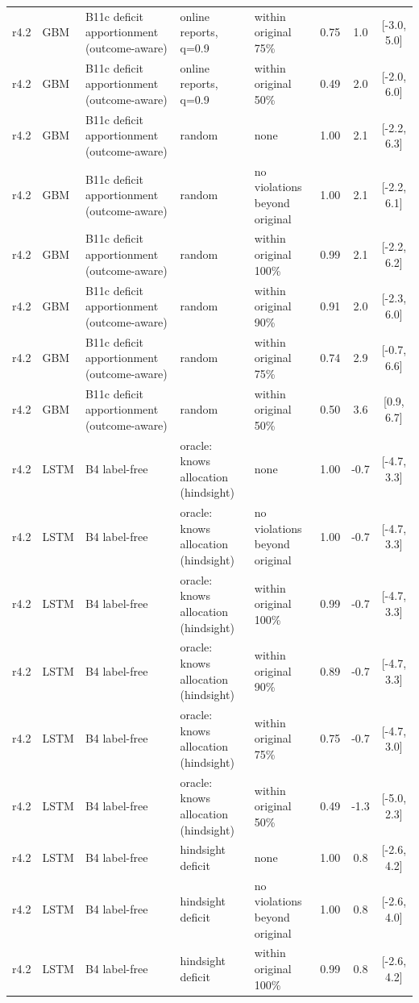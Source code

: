 \documentclass[10pt,onecolumn,letterpaper]{article}
\begin{document}
\begin{longtable}{lllp{4.2cm}p{3.4cm}ccc}
r4.2 & GBM & B11c deficit apportionment (outcome-aware) & online reports, q=0.9 & within original 75\% & 0.75 & 1.0 & [-3.0, 5.0] \\
r4.2 & GBM & B11c deficit apportionment (outcome-aware) & online reports, q=0.9 & within original 50\% & 0.49 & 2.0 & [-2.0, 6.0] \\
r4.2 & GBM & B11c deficit apportionment (outcome-aware) & random & none & 1.00 & 2.1 & [-2.2, 6.3] \\
r4.2 & GBM & B11c deficit apportionment (outcome-aware) & random & no violations beyond original & 1.00 & 2.1 & [-2.2, 6.1] \\
r4.2 & GBM & B11c deficit apportionment (outcome-aware) & random & within original 100\% & 0.99 & 2.1 & [-2.2, 6.2] \\
r4.2 & GBM & B11c deficit apportionment (outcome-aware) & random & within original 90\% & 0.91 & 2.0 & [-2.3, 6.0] \\
r4.2 & GBM & B11c deficit apportionment (outcome-aware) & random & within original 75\% & 0.74 & 2.9 & [-0.7, 6.6] \\
r4.2 & GBM & B11c deficit apportionment (outcome-aware) & random & within original 50\% & 0.50 & 3.6 & [0.9, 6.7] \\
r4.2 & LSTM & B4 label-free & oracle: knows allocation (hindsight) & none & 1.00 & -0.7 & [-4.7, 3.3] \\
r4.2 & LSTM & B4 label-free & oracle: knows allocation (hindsight) & no violations beyond original & 1.00 & -0.7 & [-4.7, 3.3] \\
r4.2 & LSTM & B4 label-free & oracle: knows allocation (hindsight) & within original 100\% & 0.99 & -0.7 & [-4.7, 3.3] \\
r4.2 & LSTM & B4 label-free & oracle: knows allocation (hindsight) & within original 90\% & 0.89 & -0.7 & [-4.7, 3.3] \\
r4.2 & LSTM & B4 label-free & oracle: knows allocation (hindsight) & within original 75\% & 0.75 & -0.7 & [-4.7, 3.0] \\
r4.2 & LSTM & B4 label-free & oracle: knows allocation (hindsight) & within original 50\% & 0.49 & -1.3 & [-5.0, 2.3] \\
r4.2 & LSTM & B4 label-free & hindsight deficit & none & 1.00 & 0.8 & [-2.6, 4.2] \\
r4.2 & LSTM & B4 label-free & hindsight deficit & no violations beyond original & 1.00 & 0.8 & [-2.6, 4.0] \\
r4.2 & LSTM & B4 label-free & hindsight deficit & within original 100\% & 0.99 & 0.8 & [-2.6, 4.2] \\

\end{longtable}
\end{document}
